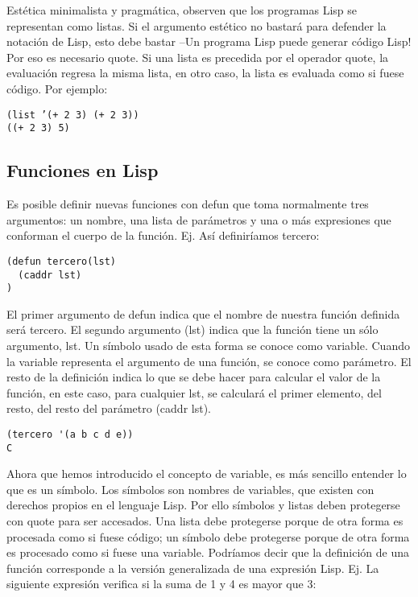 \documentclass[11pt]{article}
\begin{document}
Estética minimalista y pragmática, observen que los programas Lisp se
representan como listas. Si el argumento estético no bastará para defender la
notación de Lisp, esto debe bastar –Un programa Lisp puede generar código
Lisp! Por eso es necesario quote. Si una lista es precedida por el operador
quote, la evaluación regresa la misma lista, en otro caso, la lista es evaluada
como si fuese código. Por ejemplo:

\begin{verbatim}
(list ’(+ 2 3) (+ 2 3))
((+ 2 3) 5)
\end{verbatim}


\subsection*{Funciones en Lisp}
\label{sec:orga21e3bf}
Es posible definir nuevas funciones con defun que toma normalmente tres
argumentos: un nombre, una lista de parámetros y una o más expresiones
que conforman el cuerpo de la función. Ej. Así definiríamos tercero:

\begin{verbatim}
(defun tercero(lst)
  (caddr lst)
)
\end{verbatim}

El primer argumento de defun indica que el nombre de nuestra función
definida será tercero. El segundo argumento (lst) indica que la
función tiene un sólo argumento, lst. Un símbolo usado de esta forma
se conoce como variable. Cuando la variable representa el argumento de
una función, se conoce como parámetro. El resto de la definición
indica lo que se debe hacer para calcular el valor de la función, en
este caso, para cualquier lst, se calculará el primer elemento, del
resto, del resto del parámetro (caddr lst).

\begin{verbatim}
(tercero '(a b c d e))
C
\end{verbatim}

Ahora que hemos introducido el concepto de variable, es más sencillo
entender lo que es un símbolo. Los símbolos son nombres de variables, que
existen con derechos propios en el lenguaje Lisp. Por ello símbolos y listas
deben protegerse con quote para ser accesados. Una lista debe protegerse
porque de otra forma es procesada como si fuese código; un símbolo debe
protegerse porque de otra forma es procesado como si fuese una variable.
Podríamos decir que la definición de una función corresponde a la versión
generalizada de una expresión Lisp. Ej. La siguiente expresión verifica si la
suma de 1 y 4 es mayor que 3:
\end{document}
